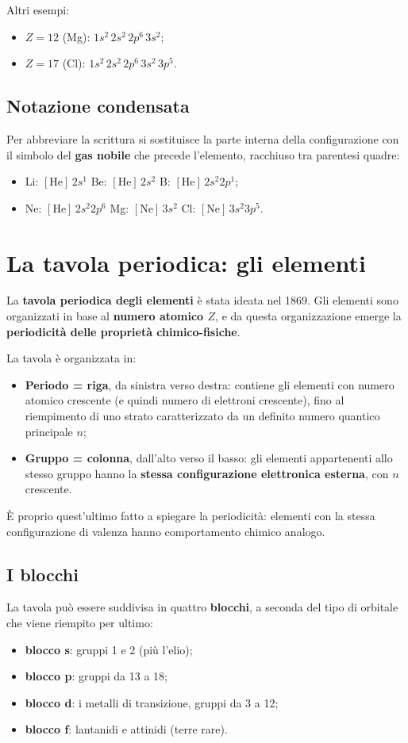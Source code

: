 \documentclass[11pt, a4paper, openright]{book}
\begin{document}
Altri esempi:
\begin{itemize}
    \item $Z = 12$ (Mg): $1s^2\,2s^2\,2p^6\,3s^2$;
    \item $Z = 17$ (Cl): $1s^2\,2s^2\,2p^6\,3s^2\,3p^5$.
\end{itemize}

\subsection{Notazione condensata}
Per abbreviare la scrittura si sostituisce la parte interna della configurazione con il simbolo del \textbf{gas nobile} che precede l'elemento, racchiuso tra parentesi quadre:
\begin{itemize}
    \item Li: $[\text{He}]\,2s^1$ \qquad Be: $[\text{He}]\,2s^2$ \qquad B: $[\text{He}]\,2s^2 2p^1$;
    \item Ne: $[\text{He}]\,2s^2 2p^6$ \qquad Mg: $[\text{Ne}]\,3s^2$ \qquad Cl: $[\text{Ne}]\,3s^2 3p^5$.
\end{itemize}

\newpage

\section{La tavola periodica: gli elementi}
La \textbf{tavola periodica degli elementi} è stata ideata nel 1869. Gli elementi sono organizzati in base al \textbf{numero atomico $Z$}, e da questa organizzazione emerge la \textbf{periodicità delle proprietà chimico-fisiche}.

La tavola è organizzata in:
\begin{itemize}
    \item \textbf{Periodo = riga}, da sinistra verso destra: contiene gli elementi con numero atomico crescente (e quindi numero di elettroni crescente), fino al riempimento di uno strato caratterizzato da un definito numero quantico principale $n$;
    \item \textbf{Gruppo = colonna}, dall'alto verso il basso: gli elementi appartenenti allo stesso gruppo hanno la \textbf{stessa configurazione elettronica esterna}, con $n$ crescente.
\end{itemize}
È proprio quest'ultimo fatto a spiegare la periodicità: elementi con la stessa configurazione di valenza hanno comportamento chimico analogo.

\subsection{I blocchi}
La tavola può essere suddivisa in quattro \textbf{blocchi}, a seconda del tipo di orbitale che viene riempito per ultimo:
\begin{itemize}
    \item \textbf{blocco s}: gruppi 1 e 2 (più l'elio);
    \item \textbf{blocco p}: gruppi da 13 a 18;
    \item \textbf{blocco d}: i metalli di transizione, gruppi da 3 a 12;
    \item \textbf{blocco f}: lantanidi e attinidi (terre rare).
\end{itemize}
\end{document}
